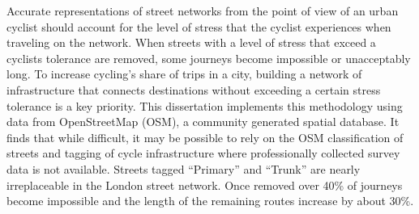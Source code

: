 
Accurate representations of street networks from the point of view of an urban cyclist should account for the level of stress that the cyclist experiences when traveling on the network. When streets with a level of stress that exceed a cyclists tolerance are removed, some journeys become impossible or unacceptably long. To increase cycling's share of trips in a city, building a network of infrastructure that connects destinations without exceeding a certain stress tolerance is a key priority. This dissertation implements this methodology using data from OpenStreetMap (OSM), a community generated spatial database. It finds that while difficult, it may be possible to rely on the OSM classification of streets and tagging of cycle infrastructure where professionally collected survey data is not available. Streets tagged ``Primary'' and ``Trunk'' are nearly irreplaceable in the London street network. Once removed over 40\% of journeys become impossible and the length of the remaining routes increase by about 30\%. 